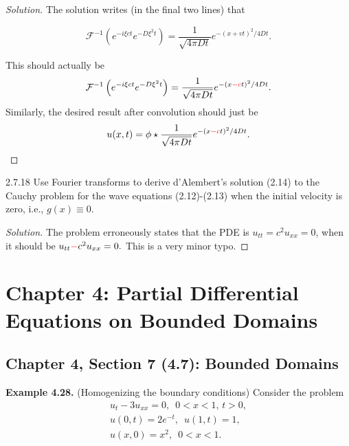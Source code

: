 \documentclass[11pt]{article}
\newenvironment{solution}
  {\renewcommand\qedsymbol{$\blacksquare$}\begin{proof}[Solution]}
  {\end{proof}}
\theoremstyle{definition}
\begin{document}
\begin{solution}
The solution writes (in the final two lines) that 

\[ \mathcal{F}^{-1}\left( e^{-i\xi ct}e^{-D\xi^2 t}\right) = \frac{1}{\sqrt{4\pi Dt}}e^{-(x+vt)^2/4Dt}. \]

This should actually be \[ \mathcal{F}^{-1}\left( e^{-i\xi ct}e^{-D\xi^2 t}\right) = \frac{1}{\sqrt{4\pi Dt}}e^{-(x\textcolor{red}{-c}t)^2/4Dt}. \]
Similarly, the desired result after convolution should just be 
\[ u(x, t) = \phi \star \frac{1}{\sqrt{4\pi Dt}}e^{-(x\textcolor{red}{-c}t)^2/4Dt}. \]
\end{solution}


\begin{exercise}{2.7.18}
  Use Fourier transforms to derive d'Alembert's solution (2.14) to the Cauchy problem for the wave equations 
  (2.12)-(2.13) when the initial velocity is zero, i.e., $g(x) \equiv 0$. 
\end{exercise}

\begin{solution}
  The problem erroneously states that the PDE is $u_{tt} = c^2u_{xx} = 0$, when it should be $u_{tt} \textcolor{red}{-}c ^2u_{xx} = 0.$ This is a very minor typo.
\end{solution}

\newpage

\setcounter{section}{3}
\section{Chapter 4: Partial Differential Equations on Bounded Domains}

\setcounter{subsection}{6}

\subsection{Chapter 4, Section 7 (4.7): Bounded Domains}
\textbf{Example 4.28.} (Homogenizing the boundary conditions) Consider the problem
\[
\begin{array}{c}
u_{t} - 3u_{xx} = 0, \, \, \, 0 < x < 1, \, t > 0,\\
u(0, t) = 2e^{-t}, \, \, \, u(1, t) = 1,\\
u(x, 0) = x^2, \,\,\, 0 < x < 1.
\end{array}
\]
\end{document}
